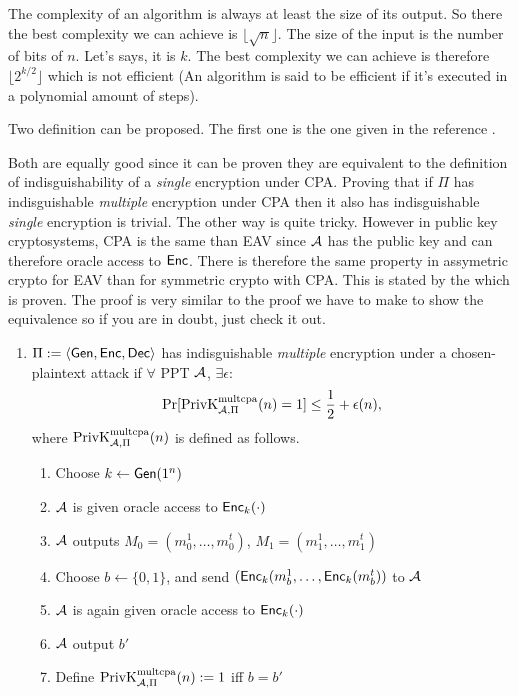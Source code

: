 \begin{solution}
  The complexity of an algorithm is always at least
  the size of its output.
  So there the best complexity we can achieve is $\lfloor\sqrt{n}\rfloor$.
  The size of the input is the number of bits of $n$.
  Let's says, it is $k$.
  The best complexity we can achieve is therefore
  $\lfloor2^{k/2}\rfloor$ which is not efficient (An algorithm is said to be efficient if it's executed in a polynomial amount of steps).
\end{solution}

\begin{solution}
  Two definition can be proposed.
  The first one is the one given in the reference \cite[p.~84]{katz2007introduction}.

  Both are equally good since it can be proven they are equivalent to the definition of indisguishability of a \emph{single} encryption
  under CPA.
  Proving that if $\Pi$ has indisguishable \emph{multiple} encryption under CPA then it also has indisguishable \emph{single} encryption
  is trivial.
  The other way is quite tricky.
  However in public key cryptosystems, CPA is the same than EAV since $\mathcal{A}$ has the public key and can therefore oracle access to $\operatorname{\mathsf{Enc}}$.
  There is therefore the same property in assymetric crypto for EAV than for symmetric crypto with CPA.
  This is stated by the \cite[theorem~10.10]{katz2007introduction} which is proven.
  The proof is very similar to the proof we have to make to show the equivalence so if you are in doubt, just check it out.

  \begin{enumerate}

    \item
      $\Pi := \langle\operatorname{\mathsf{Gen}}, \operatorname{\mathsf{Enc}}, \operatorname{\mathsf{Dec}}\rangle$ has indisguishable \emph{multiple} encryption under a chosen-plaintext attack
      if $\forall$ PPT $\mathcal{A}$, $\exists \epsilon$:
      \[ \Pr[\operatorname{PrivK}^{\text{multcpa}}_{\mathcal{A},\Pi}(n) = 1] \leq \frac{1}{2} + \epsilon(n), \]
      where $\operatorname{PrivK}^{\text{multcpa}}_{\mathcal{A},\Pi}(n)$ is defined as follows.
      \begin{enumerate}
        \item Choose $k \leftarrow \operatorname{\mathsf{Gen}}(1^n)$
        \item $\mathcal{A}$ is given oracle access to $\operatorname{\mathsf{Enc}}_k(\cdot)$
        \item $\mathcal{A}$ outputs $M_0 = (m_0^1, \ldots, m_0^t)$, $M_1 = (m_1^1, \ldots, m_1^t)$
        \item Choose $b \leftarrow \{0,1\}$, and send $(\operatorname{\mathsf{Enc}}_k(m_b^1, \ldots, \operatorname{\mathsf{Enc}}_k(m_b^t))$ to $\mathcal{A}$
        \item $\mathcal{A}$ is again given oracle access to $\operatorname{\mathsf{Enc}}_k(\cdot)$
        \item $\mathcal{A}$ output $b'$
        \item Define $\operatorname{PrivK}^{\text{multcpa}}_{\mathcal{A},\Pi}(n) := 1$ iff $b = b'$
      \end{enumerate}
	


\end{enumerate}
\end{solution}
